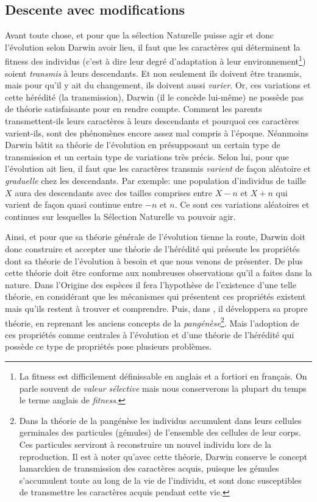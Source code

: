 \subsection{Descente avec modifications}\label{sec:hered}
Avant toute chose, et pour que la sélection Naturelle puisse agir et donc l'évolution selon Darwin avoir lieu, il faut que les caractères qui déterminent la fitness des individus (c'est à dire leur degré d'adaptation à leur environnement\footnote{La fitness est difficilement définissable en anglais et a fortiori en français. On parle souvent de \emph{valeur sélective} mais nous conserverons la plupart du temps le terme anglais de \emph{fitness}.}) soient \emph{transmis} à leurs descendants. Et non seulement ils doivent être transmis, mais pour qu'il y ait du changement, ils doivent aussi \emph{varier}. Or, ces variations et cette hérédité (la transmission), Darwin (il le concède lui-même) ne possède pas de théorie satisfaisante pour en rendre compte. Comment les parents transmettent-ils leurs caractères à leurs descendants et pourquoi ces caractères varient-ils, sont des phénomènes encore assez mal compris à l'époque. Néanmoins Darwin bâtit sa théorie de l'évolution en présupposant un certain type de transmission et un certain type de variations très précis. Selon lui, pour que l'évolution ait lieu, il faut que les caractères transmis \emph{varient} de façon aléatoire et \emph{graduelle} chez les descendants. Par exemple: une population d'individus de taille $X$ aura des descendants avec des tailles comprises entre $X-n$ et $X+n$ qui varient de façon quasi continue entre $-n$ et $n$. Ce sont ces variations aléatoires et continues sur lesquelles la Sélection Naturelle va pouvoir agir.

Ainsi, et pour que sa théorie générale de l'évolution tienne la route, Darwin doit donc construire et accepter une théorie de l'hérédité qui présente les propriétés dont sa théorie de l'évolution à besoin et que nous venons de présenter. De plus cette théorie doit être conforme aux nombreuses observations qu'il a faites dans la nature. Dans l'Origine des espèces il fera l'hypothèse de l'existence d'une telle théorie, en considérant que les mécanismes qui présentent ces propriétés existent mais qu'ils restent à trouver et comprendre. Puis, dans \cite{darwin1868variation}, il développera sa propre théorie, en reprenant les anciens concepts de la \emph{pangénèse}\footnote{Dans la théorie de la pangénèse les individus accumulent dans leurs cellules germinales des particules (gémules) de l'ensemble des cellules de leur corps. Ces particules serviront à reconstruire un nouvel individu lors de la reproduction. Il est à noter qu'avec cette théorie, Darwin conserve le concept lamarckien de transmission des caractères acquis, puisque les gémules s'accumulent toute au long de la vie de l'individu, et sont donc susceptibles de transmettre les caractères acquis pendant cette vie.}. Mais l'adoption de ces propriétés comme centrales à l'évolution et d'une théorie de l'hérédité qui possède ce type de propriétés pose plusieurs problèmes.

